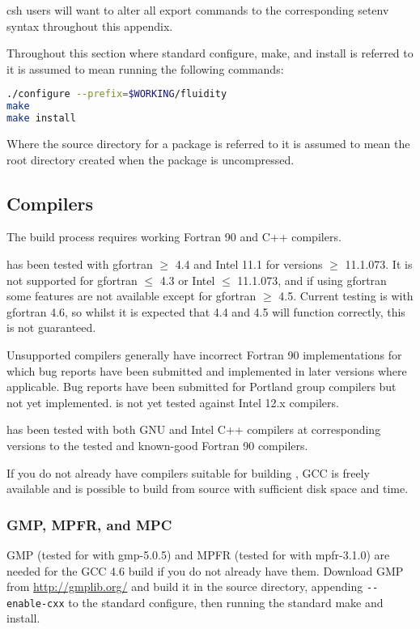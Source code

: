csh users will want to alter all export commands to the corresponding setenv
syntax throughout this appendix.

Throughout this section where standard configure, make, and install is referred
to it is assumed to mean running the following commands:

\begin{lstlisting}[language=bash]
./configure --prefix=$WORKING/fluidity
make
make install
\end{lstlisting}

Where the source directory for a package is referred to it is assumed to mean
the root directory created when the package is uncompressed.

\subsection{Compilers}
\label{sec:required_libraries_compilers}

The \fluidity build process requires working Fortran 90 and C++ compilers.

\fluidity has been tested with gfortran $\geq$ 4.4 and Intel 11.1 for versions
$\geq$ 11.1.073. It is not supported for gfortran $\leq$ 4.3 or Intel $\leq$
11.1.073, and if using gfortran some features are not available except for
gfortran $\geq$ 4.5. Current testing is with gfortran 4.6, so whilst it is
expected that 4.4 and 4.5 will function correctly, this is not guaranteed.

Unsupported compilers generally have incorrect Fortran 90 implementations for
which bug reports have been submitted and implemented in later versions where
applicable. Bug reports have been submitted for Portland group compilers but
not yet implemented. \fluidity is not yet tested against Intel 12.x compilers.

\fluidity has been tested with both GNU and Intel C++ compilers at corresponding
versions to the tested and known-good Fortran 90 compilers.

If you do not already have compilers suitable for building \fluidity, GCC is
freely available and is possible to build from source with sufficient disk
space and time.

\subsubsection{GMP, MPFR, and MPC}
\label{sec:required_libraries_compilers_gmp_mpfr_mpc}

GMP (tested for \fluidity with gmp-5.0.5) and MPFR (tested for \fluidity with
mpfr-3.1.0) are needed for the GCC 4.6 build if you do not already have them.
Download GMP from \url{http://gmplib.org/} and build it in the source
directory, appending \lstinline[language=bash]+--enable-cxx+ to the standard
configure, then running the standard make and install.

